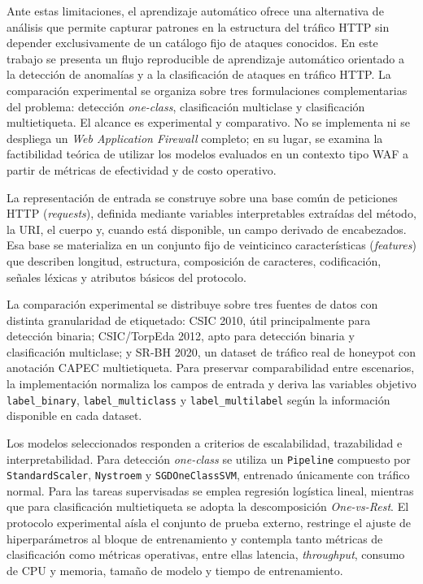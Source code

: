 \documentclass[12pt,oneside]{report}
\begin{document}
Ante estas limitaciones, el aprendizaje automático ofrece una alternativa de análisis que permite capturar patrones en la estructura del tráfico HTTP sin depender exclusivamente de un catálogo fijo de ataques conocidos. En este trabajo se presenta un flujo reproducible de aprendizaje automático orientado a la detección de anomalías y a la clasificación de ataques en tráfico HTTP. La comparación experimental se organiza sobre tres formulaciones complementarias del problema: detección \textit{one-class}, clasificación multiclase y clasificación multietiqueta. El alcance es experimental y comparativo. No se implementa ni se despliega un \textit{Web Application Firewall} completo; en su lugar, se examina la factibilidad teórica de utilizar los modelos evaluados en un contexto tipo WAF a partir de métricas de efectividad y de costo operativo.

La representación de entrada se construye sobre una base común de peticiones HTTP (\textit{requests}), definida mediante variables interpretables extraídas del método, la URI, el cuerpo y, cuando está disponible, un campo derivado de encabezados. Esa base se materializa en un conjunto fijo de veinticinco características (\textit{features}) que describen longitud, estructura, composición de caracteres, codificación, señales léxicas y atributos básicos del protocolo.

La comparación experimental se distribuye sobre tres fuentes de datos con distinta granularidad de etiquetado: CSIC 2010, útil principalmente para detección binaria; CSIC/TorpEda 2012, apto para detección binaria y clasificación multiclase; y SR-BH 2020, un dataset de tráfico real de honeypot con anotación CAPEC multietiqueta. Para preservar comparabilidad entre escenarios, la implementación normaliza los campos de entrada y deriva las variables objetivo \texttt{label\_binary}, \texttt{label\_multiclass} y \texttt{label\_multilabel} según la información disponible en cada dataset.

Los modelos seleccionados responden a criterios de escalabilidad, trazabilidad e interpretabilidad. Para detección \textit{one-class} se utiliza un \texttt{Pipeline} compuesto por \texttt{StandardScaler}, \texttt{Nystroem} y \texttt{SGDOneClassSVM}, entrenado únicamente con tráfico normal. Para las tareas supervisadas se emplea regresión logística lineal, mientras que para clasificación multietiqueta se adopta la descomposición \textit{One-vs-Rest}. El protocolo experimental aísla el conjunto de prueba externo, restringe el ajuste de hiperparámetros al bloque de entrenamiento y contempla tanto métricas de clasificación como métricas operativas, entre ellas latencia, \textit{throughput}, consumo de CPU y memoria, tamaño de modelo y tiempo de entrenamiento.
\end{document}
